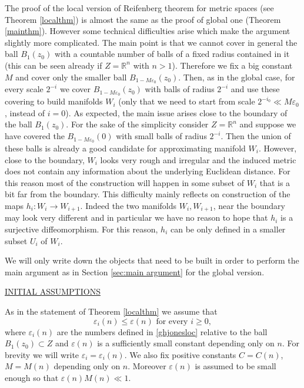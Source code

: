 \documentclass[11pt]{article}
\newcommand{\eps}{\varepsilon}
\newcommand{\rr}{\mathbb{R}}
\theoremstyle{plain}
\theoremstyle{definition}
\numberwithin{equation}{section}
\begin{document}
The proof of the local version of Reifenberg theorem for metric spaces (see Theorem \ref{localthm})  is almost the same as the proof of global one (Theorem \ref{mainthm}). However some technical difficulties arise which make the argument slightly more complicated. The main point is that we cannot cover in general the ball $B_{1}(z_0)$ with a countable number of balls of a fixed radius contained in it (this can be seen already if $Z=\rr^n$ with $n>1$). Therefore we fix a big constant $M$   and cover only the smaller ball $B_{1-M\eps_0}(z_0)$. Then, as in the global case, for every scale $2^{-i}$ we cover $B_{1-M\eps_0}(z_0)$ with balls of radius $2^{-i}$ and use these covering to build manifolds $W_i$ (only that we need to start from scale $2^{-i_0}\ll M\eps_0$, instead of $i=0$).
As expected, the main issue arises  close to the boundary of the ball $B_{1}(z_0)$. For the sake of the simplicity consider $Z=\rr^n$ and suppose we have covered the $B_{1-M\eps_0}(0)$ with small balls of radius $2^{-i}$. Then the union of these balls is already a good candidate for approximating manifold $W_i$. However, close to the boundary, $W_i$ looks very rough and irregular and the induced metric does not contain any  information about the underlying Euclidean distance.  For this reason most of the construction will happen in some subset of $W_i$ that is a bit far from the boundary. This difficulty mainly reflects on construction of the maps $h_i : W_i \to W_{i+1}$. Indeed the two manifolds $W_i,W_{i+1}$, near the boundary may look very different and in particular we have no reason to hope that $h_i$ is a surjective diffeomorphism. For this reason, $h_i$ can be only defined in a smaller subset $U_i$ of $W_i$.

We will only write down the objects that need to be built in order to perform the main argument as in Section \ref{sec:main argument} for the global version.

\begin{center}
	\underline{INITIAL ASSUMPTIONS} \\
\end{center}


As in the statement of Theorem \ref{localthm} we assume that 
\begin{equation}\label{mainass}
\eps_i(n)\le \eps(n) \text{ for every } i \ge 0,
\end{equation}
where $\eps_i(n)$ are the numbers defined in \eqref{ghjonesloc} relative to  the ball $B_1(z_0)\subset Z$ and $\eps(n)$ is a sufficiently small constant depending only on $n.$ For brevity we will write $\eps_i=\eps_i(n).$ We also fix positive constants $C=C(n)$, $M=M(n)$ depending only on $n$. Moreover $\eps(n)$ is assumed to be small enough so that $\eps(n)M(n)\ll 1.$
\end{document}
